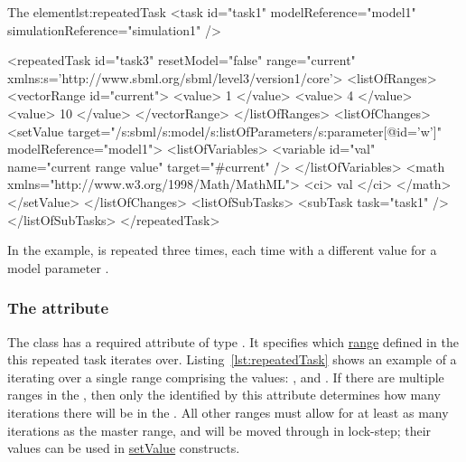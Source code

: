 



%
\begin{myXmlLst}{The  element}{lst:repeatedTask}
<task id="task1" modelReference="model1" simulationReference="simulation1" />

<repeatedTask id="task3" resetModel="false" range="current"
    xmlns:s='http://www.sbml.org/sbml/level3/version1/core'>
  <listOfRanges>
    <vectorRange id="current"> 
        <value> 1 </value> 
        <value> 4 </value> 
        <value> 10 </value> 
    </vectorRange> 
  </listOfRanges>
  <listOfChanges>
     <setValue target="/s:sbml/s:model/s:listOfParameters/s:parameter[@id='w']" modelReference="model1">
       <listOfVariables> 
         <variable id="val" name="current range value" target="#current" /> 
       </listOfVariables> 
       <math xmlns="http://www.w3.org/1998/Math/MathML"> 
         <ci> val </ci> 
       </math> 
     </setValue> 
  </listOfChanges>
  <listOfSubTasks>
    <subTask task="task1" />
  </listOfSubTasks>
</repeatedTask>
\end{myXmlLst}
%
In the example,  is repeated three times, each time with a different value for a model parameter . 


\subsubsection{The  attribute}
\label{sec:rangeAttribute}
The  class has a required attribute  of type .
It specifies which \hyperref[class:range]{range} defined in the  this repeated task iterates over.
Listing~\ref{lst:repeatedTask} shows an example of a  iterating over a single range comprising the values: ,  and .
If there are multiple ranges in the , then only the  identified by this attribute determines how many iterations there will be in the .
All other ranges must allow for at least as many iterations as the master range, and will be moved through in lock-step; their values can be used in \hyperref[class:setValue]{setValue} constructs.


